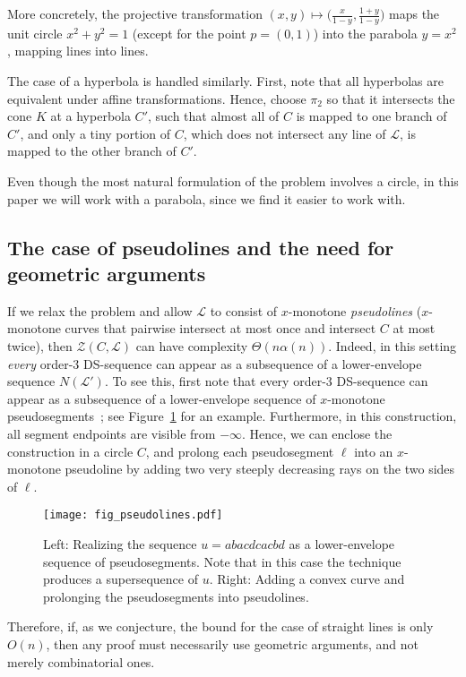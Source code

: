 \documentclass[11pt]{article}
\theoremstyle{definition}
\theoremstyle{remark}
\begin{document}
More concretely, the projective transformation $(x,y)\mapsto\bigl(\frac{x}{1-y},\frac{1+y}{1-y}\bigr)$ maps the unit circle $x^2+y^2=1$ (except for the point $p=(0,1)$) into the parabola $y=x^2$, mapping lines into lines.

The case of a hyperbola is handled similarly. First, note that all hyperbolas are equivalent under affine transformations. Hence, choose $\pi_2$ so that it intersects the cone $K$ at a hyperbola $C'$, such that almost all of $C$ is mapped to one branch of $C'$, and only a tiny portion of $C$, which does not intersect any line of $\mathcal L$, is mapped to the other branch of $C'$.

Even though the most natural formulation of the problem involves a circle, in this paper we will work with a parabola, since we find it easier to work with.

\subsection{The case of pseudolines and the need for geometric arguments}

If we relax the problem and allow $\mathcal L$ to consist of $x$-monotone \emph{pseudolines} ($x$-monotone curves that pairwise intersect at most once and intersect $C$ at most twice), then $\mathcal Z(C,\mathcal L)$ can have complexity $\Theta(n\alpha(n))$. Indeed, in this setting \emph{every} order-$3$ DS-sequence can appear as a subsequence of a lower-envelope sequence $N(\mathcal L')$. To see this, first note that every order-$3$ DS-sequence can appear as a subsequence of a lower-envelope sequence of $x$-monotone pseudosegments~\cite{DS_book}; see Figure~\ref{fig_pseudolines} for an example. Furthermore, in this construction, all segment endpoints are visible from $-\infty$. Hence, we can enclose the construction in a circle $C$, and prolong each pseudosegment $\ell$ into an $x$-monotone pseudoline by adding two very steeply decreasing rays on the two sides of $\ell$.

\begin{figure}
\centerline{\texttt{[image: fig\_pseudolines.pdf]}}
\caption{\label{fig_pseudolines}Left: Realizing the sequence $u=abacdcacbd$ as a lower-envelope sequence of pseudosegments. Note that in this case the technique produces a supersequence of $u$. Right: Adding a convex curve and prolonging the pseudosegments into pseudolines.}
\end{figure}

Therefore, if, as we conjecture, the bound for the case of straight lines is only $O(n)$, then any proof must necessarily use geometric arguments, and not merely combinatorial ones.
\end{document}
